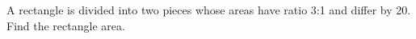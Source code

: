 A rectangle is divided into two pieces whose areas have ratio 3:1 and differ by 20. Find the rectangle area.
